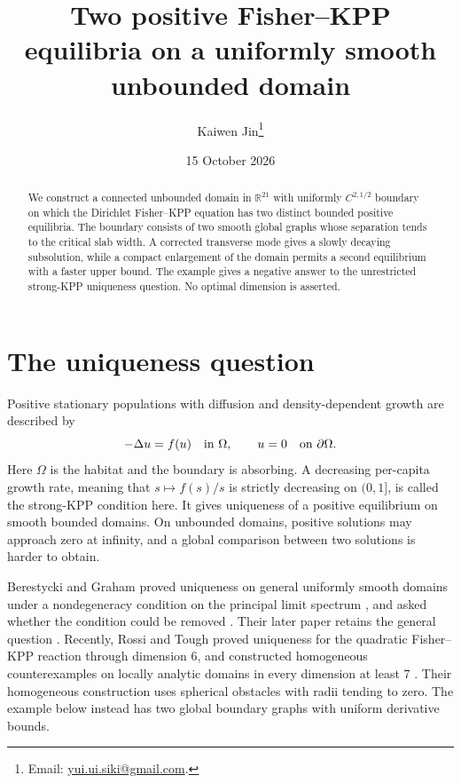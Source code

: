 \documentclass[11pt]{article}
\title{Two positive Fisher--KPP equilibria on a uniformly smooth unbounded domain}
\author{Kaiwen Jin\thanks{Email: \href{mailto:yui.ui.siki@gmail.com}{yui.ui.siki@gmail.com}.}}
\date{15 October 2026}
\newcommand{\R}{\mathbb R}
\newcommand{\Om}{\Omega}
\begin{document}
\maketitle

\begin{abstract}
We construct a connected unbounded domain in $\R^{21}$ with uniformly
$C^{2,1/2}$ boundary on which the Dirichlet Fisher--KPP equation has two
distinct bounded positive equilibria. The boundary consists of two smooth
global graphs whose separation tends to the critical slab width.
A corrected transverse mode gives a slowly decaying subsolution, while a
compact enlargement of the domain permits a second equilibrium with a
faster upper bound. The example gives a negative answer to the unrestricted
strong-KPP uniqueness question. No optimal dimension is asserted.
\end{abstract}

\section{The uniqueness question}

Positive stationary populations with diffusion and density-dependent growth
are described by
\begin{equation}\label{eq:problem}
 -\Delta u=f(u)\quad\hbox{in }\Om,\qquad u=0\quad\hbox{on }\partial\Om.
\end{equation}
Here $\Om$ is the habitat and the boundary is absorbing. A decreasing
per-capita growth rate, meaning that $s\mapsto f(s)/s$ is strictly decreasing
on $(0,1]$, is called the strong-KPP condition here. It gives uniqueness of a positive
equilibrium on smooth bounded domains. On unbounded domains, positive
solutions may approach zero at infinity, and a global comparison between
two solutions is harder to obtain.

Berestycki and Graham proved uniqueness on general uniformly smooth domains
under a nondegeneracy condition on the principal limit spectrum
\cite[Theorem~1.1]{BGKPP}, and asked whether the condition could be removed
\cite[Conjecture~1.3]{BGKPP}. Their later paper retains the general question
\cite[Section~8.1, Open Question~3]{BGSC}. Recently, Rossi and Tough proved uniqueness for the quadratic Fisher--KPP
reaction through dimension 6, and constructed homogeneous counterexamples
on locally analytic domains in every dimension at least 7
\cite[Theorems~1.5, 1.8 and 7.1]{RT}. Their homogeneous construction uses
spherical obstacles with radii tending to zero. The example below instead
has two global boundary graphs with uniform derivative bounds.
\end{document}
